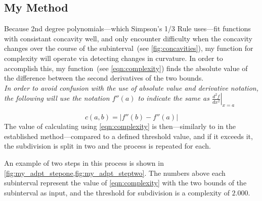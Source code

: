 \documentclass{paper}
\begin{document}
\subsection{My Method}
\label{sec:my_method}
Because 2nd degree polynomials---which Simpson's 1/3 Rule uses---fit functions with consistant concavity well, and only encounter difficulty when the concavity changes over the course of the subinterval~(see \cref{fig:concavities}), my function for complexity will operate via detecting changes in curvature.
In order to accomplish this, my function~(see \cref{eqn:complexity}) finds the absolute value of the difference between the second derivatives of the two bounds.\\
\emph{In order to avoid confusion with the use of absolute value and derivative notation, the following will use the notation \(f''(a)\) to indicate the same as \(\left.\frac{d^2f}{dx^2}\right|_{x=a}\)}
%

%
\begin{equation}
    \label{eqn:complexity}
    c(a, b) = \left|f''(b) - f''(a)\right|
\end{equation}
%
The value of calculating using \cref{eqn:complexity} is then---similarly to in the established method---compared to a defined threshold value, and if it exceeds it, the subdivision is split in two and the process is repeated for each.

An example of two steps in this process is shown in \cref{fig:my_adpt_stepone,fig:my_adpt_steptwo}.
The numbers above each subinterval represent the value of \cref{eqn:complexity} with the two bounds of the subinterval as input, and the threshold for subdivision is a complexity of \(2.000\).
%


\end{document}
